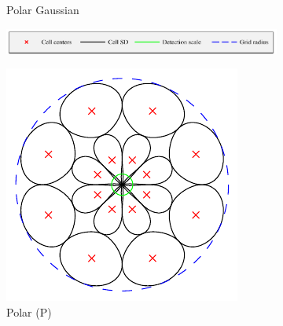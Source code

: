 \documentclass[thesis.tex]{subfiles}
\begin{document}
\begin{figure}[p]
\begin{subfigure}[t]{0.40\textwidth}
		\caption{Polar Gaussian}
		\label{fig:cellWindowPolar}
	\end{subfigure}
	\caption{The two types of Gaussian cell aperture functions plotted in 3-D. The black curves are placed 1 standard deviation $\sigma$ from the cell centers. The yellow curves are placed $3 \sigma$ from the cell centers and confine the regions used to calculate the cell histograms.}
	\label{fig:gridWindow}
	\vspace{5mm}
	\begin{subfigure}[t]{\textwidth}
		\includegraphics[width=\textwidth]{img/gridType_legend.pdf}
	\end{subfigure}
	\begin{subfigure}[t]{0.32\textwidth}
		\includegraphics[width=\textwidth]{img/gridType_polar_polar_gaussian.pdf}
		\caption{Polar (P)}
		\label{fig:gridTypeP}
	\end{subfigure}
	\begin{subfigure}[t]{0.32\textwidth}

\end{subfigure}
\end{figure}
\end{document}
